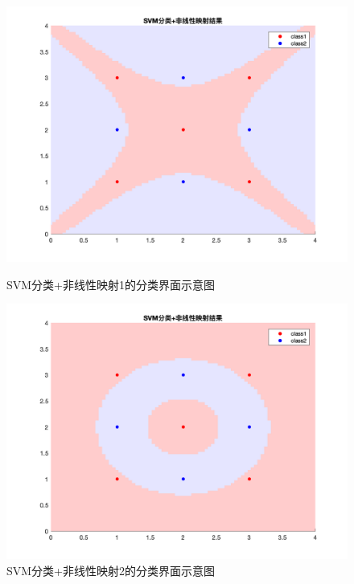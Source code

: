 \documentclass[cn]{elegantbook}
\begin{document}
\begin{figure}[!h]
	\centering
	\begin{minipage}{0.48\linewidth}
		\includegraphics[width=\textwidth]{../results/non3}
		\caption{\label{res5}SVM分类+非线性映射1的分类界面示意图}
	\end{minipage}
	\begin{minipage}{0.48\linewidth}
		\includegraphics[width=\textwidth]{../results/non4}
		\caption{\label{res6}SVM分类+非线性映射2的分类界面示意图}
	\end{minipage}
\end{figure}
\end{document}
